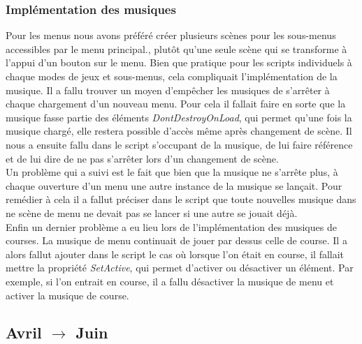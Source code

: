 \documentclass[a4paper,12pt]{article}
\begin{document}
            \subsubsection{Implémentation des musiques}
                Pour les menus nous avons préféré créer plusieurs scènes pour les sous-menus accessibles
                par le menu principal., plutôt qu'une seule scène qui se transforme à l'appui d'un 
                bouton sur le menu.
                Bien que pratique pour les scripts individuels à chaque modes de jeux et sous-menus,
                cela compliquait l'implémentation de la musique. Il a fallu trouver un moyen d'empêcher
                les musiques de s'arrêter à chaque chargement d'un nouveau menu. Pour cela il
                fallait faire en sorte que la musique fasse partie des éléments
                \textit{DontDestroyOnLoad}, qui permet qu'une fois la musique chargé, elle restera 
                possible d'accès
                même après changement de scène. Il nous a ensuite fallu dans le script s'occupant de la 
                musique, de lui faire référence et de lui dire de ne pas s'arrêter lors d'un changement
                de scène.\\
                Un problème qui a suivi est le fait que bien que la musique ne s'arrête plus, à chaque
                ouverture d'un menu une autre instance de la musique se lançait. Pour remédier à cela il
                a fallut préciser dans le script que toute nouvelles musique dans ne scène de menu ne
                devait pas se lancer si une autre se jouait déjà.\\
                Enfin un dernier problème a eu lieu lors de l'implémentation des musiques de courses. La
                musique de menu continuait de jouer par dessus celle de course. Il a alors fallut
                ajouter dans le script le cas où lorsque l'on était en course, il fallait mettre la 
                propriété \textit{SetActive}, qui permet d'activer ou désactiver un élément. Par 
                exemple, si l'on entrait en course, il a fallu désactiver la musique de menu et activer 
                la musique de course.
        
        
        
        
        
        \subsection{Avril $\to$ Juin}
    
\end{document}
